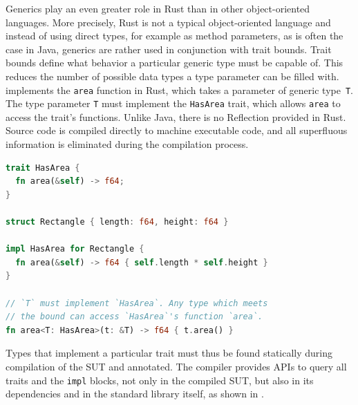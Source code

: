 \documentclass[paper=a4,%
  twoside,%
  BCOR4mm,%
  abstract=true,%
  toc=bibliography,%
  chapterprefix=true,%
  toc=bibliographynumbered,%
  open=right,%
  english,%
  pagesize=pdftex]{scrreprt}
\begin{document}
%
%
%


Generics play an even greater role in Rust than in other object-oriented languages. More precisely, Rust is not a typical object-oriented language and instead of using direct types, for example as method parameters, as is often the case in Java, generics are rather used in conjunction with trait bounds. Trait bounds define what behavior a particular generic type must be capable of. This reduces the number of possible data types a type parameter can be filled with.  implements the \lstinline{area} function in Rust, which takes a parameter of generic type~\lstinline{T}. The type parameter \lstinline{T} must implement the \lstinline{HasArea} trait, which allows \lstinline{area} to access the trait's functions. Unlike Java, there is no Reflection provided in Rust. Source code is compiled directly to machine executable code, and all superfluous information is eliminated during the compilation process.

\begin{lstlisting}[language=Rust, style=boxed, caption={A function that takes a generic types and specifies a bound}, label=lst:trait-bounds-example]
trait HasArea {
  fn area(&self) -> f64;
}

struct Rectangle { length: f64, height: f64 }

impl HasArea for Rectangle {
  fn area(&self) -> f64 { self.length * self.height }
}

// `T` must implement `HasArea`. Any type which meets
// the bound can access `HasArea`'s function `area`.
fn area<T: HasArea>(t: &T) -> f64 { t.area() }
\end{lstlisting}

Types that implement a particular trait must thus be found statically during compilation of the \ac{SUT} and annotated. The compiler provides \acp{API} to query all traits and the \lstinline{impl} blocks, not only in the compiled \ac{SUT}, but also in its dependencies and in the standard library itself, as shown in .
\end{document}

